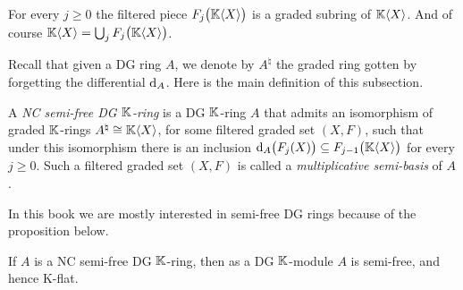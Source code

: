 For every $j \geq 0$ the filtered piece 
$F_j \bigl( \mathbb{K} \langle X \rangle \bigr)$ is a graded subring of $\mathbb{K} \langle X \rangle$. And of 
course 
$\mathbb{K} \langle X \rangle = \bigcup_{j} F_j \bigl( \mathbb{K} \langle X \rangle \bigr)$.

Recall that given a DG ring 
$A$, we denote by $A^{\natural}$ the graded ring gotten by forgetting the 
differential $\mathrm{d}_A$. Here is the main definition of this subsection. 

\begin{dfn} \label{dfn:4309}
A {\em NC semi-free DG $\mathbb{K}$-ring}%
is a DG $\mathbb{K}$-ring $A$ that 
admits an isomorphism of graded $\mathbb{K}$-rings
$A^{\natural} \cong \mathbb{K} \langle X \rangle$,
for some filtered graded set $(X, F)$, such that under this isomorphism there 
is an inclusion 
$\mathrm{d}_A \bigl( F_j(X) \bigr) \subseteq F_{j - 1} \bigl( \mathbb{K} \langle X \rangle \bigr)$ 
for every $j \geq 0$. Such a filtered graded set $(X, F)$ is called a 
{\em multiplicative semi-basis}%
of $A$. 
\end{dfn}

In this book we are mostly interested in semi-free DG rings because of the 
proposition below. 

\begin{prop} \label{prop:4305}
If $A$ is a NC semi-free DG $\mathbb{K}$-ring, then as a DG $\mathbb{K}$-module $A$ is 
semi-free, and hence K-flat. 
\end{prop}

